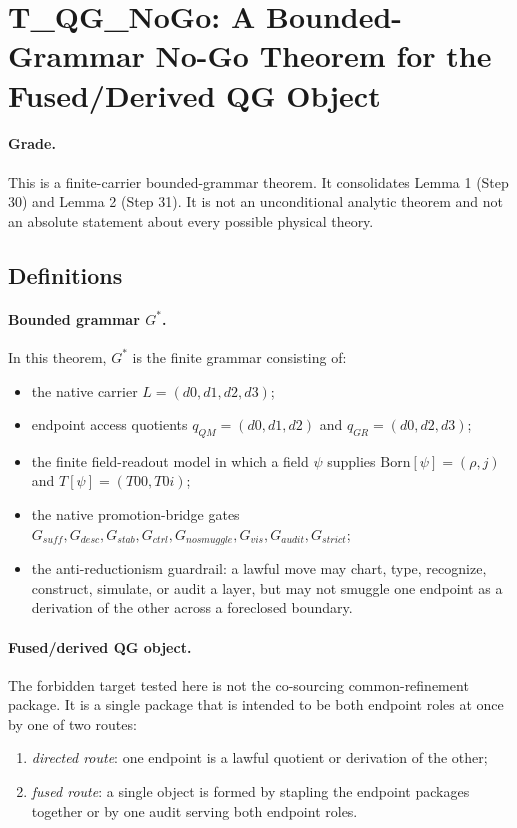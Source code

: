 \section*{T\_QG\_NoGo: A Bounded-Grammar No-Go Theorem for the Fused/Derived QG Object}

\paragraph{Grade.}
This is a finite-carrier bounded-grammar theorem.  It consolidates Lemma 1
(Step 30) and Lemma 2 (Step 31).  It is not an unconditional analytic theorem
and not an absolute statement about every possible physical theory.

\subsection*{Definitions}

\paragraph{Bounded grammar \(G^\ast\).}
In this theorem, \(G^\ast\) is the finite grammar consisting of:
\begin{itemize}
\item the native carrier \(L=(d0,d1,d2,d3)\);
\item endpoint access quotients
  \(q_{QM}=(d0,d1,d2)\) and \(q_{GR}=(d0,d2,d3)\);
\item the finite field-readout model in which a field \(\psi\) supplies
  \(\mathrm{Born}[\psi]=(\rho,j)\) and \(T[\psi]=(T00,T0i)\);
\item the native promotion-bridge gates
  \(G_{suff},G_{desc},G_{stab},G_{ctrl},G_{nosmuggle},G_{vis},G_{audit},G_{strict}\);
\item the anti-reductionism guardrail: a lawful move may chart, type,
  recognize, construct, simulate, or audit a layer, but may not smuggle one
  endpoint as a derivation of the other across a foreclosed boundary.
\end{itemize}

\paragraph{Fused/derived QG object.}
The forbidden target tested here is not the co-sourcing common-refinement
package.  It is a single package that is intended to be both endpoint roles at
once by one of two routes:
\begin{enumerate}
\item \emph{directed route}: one endpoint is a lawful quotient or derivation of
  the other;
\item \emph{fused route}: a single object is formed by stapling the endpoint
  packages together or by one audit serving both endpoint roles.
\end{enumerate}

